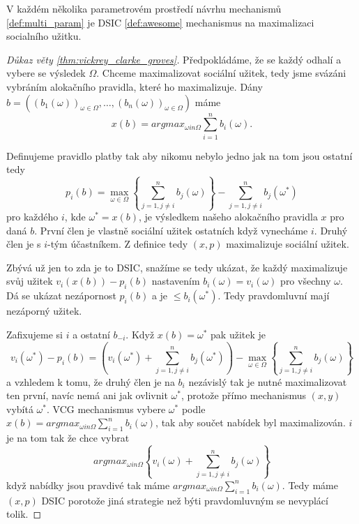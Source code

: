\begin{theorem}
    \label{thm:vickrey_clarke_groves}
    V každém několika parametrovém prostředí návrhu mechanismů \ref{def:multi_param} je DSIC \ref{def:awesome} mechanismus na maximalizaci socialního užitku. 
\end{theorem} 
\begin{proof}[Důkaz věty \ref{thm:vickrey_clarke_groves}]
   Předpokládáme, že se každý odhalí a vybere se výsledek $\Omega$. 
   Chceme maximalizovat sociální užitek, tedy jsme svázáni vybráním alokačního pravidla, které ho maximalizuje. 
   Dány $b = ((b_1(\omega))_{\omega \in \Omega},\dots,(b_n(\omega))_{\omega \in \Omega})$ máme 
   \[
       x(b) = argmax_{\omega in \Omega}\sum^n_{i=1} b_i(\omega). 
   \]

   Definujeme pravidlo platby tak aby nikomu nebylo jedno jak na tom jsou ostatní tedy 
   \[
   p_i(b) = \max_{\omega \in \Omega} \left\{ \sum^n_{j=1, j\neq i} b_j(\omega) \right\} - \sum^n_{j=1, j\neq i} b_j(\omega^*)
   \]
   pro každého $i$, kde $\omega^* = x(b)$, je výsledkem našeho alokačního pravidla $x$ pro daná $b$. 
   První člen je vlastně sociální užitek ostatních když vynecháme $i$. 
   Druhý člen je s $i$-tým účastníkem. 
   Z definice tedy $(x,p)$ maximalizuje sociální užitek. 
    
   Zbývá už jen to zda je to DSIC, snažíme se tedy ukázat, že každý maximalizuje svůj užitek $v_i(x(b)) - p_i(b)$ nastavením $b_i(\omega) = v_i(\omega)$ pro všechny $\omega$. 
   Dá se ukázat nezápornost $p_i(b)$ a je $\leq b_i(\omega^*)$. 
   Tedy pravdomluvní mají nezáporný užitek. 

   Zafixujeme si $i$ a ostatní $b_{-i}$. 
   Když $x(b)= \omega^*$ pak užitek je 
   \[
    v_i(\omega^*) - p_i(b) = \left( v_i(\omega^*) + \sum^n_{j=1, j\neq i} b_j(\omega^*) \right) - \max_{\omega \in \Omega} \left\{ \sum^n_{j=1, j\neq i} b_j(\omega) \right\} 
   \]
   a vzhledem k tomu, že druhý člen je na $b_i$ nezávislý tak je nutné maximalizovat ten první, navíc nemá ani jak ovlivnit $\omega^*$, protože přímo mechanismus $(x,y)$ vybítá $\omega^*$. 
   VCG mechanismus vybere $\omega^*$ podle  $x(b) = argmax_{\omega in \Omega}\sum^n_{i=1} b_i(\omega)$, tak aby součet nabídek byl maximalizován. 
   $i$ je na tom tak že chce vybrat 
   \[
   argmax_{\omega in \Omega} \left\{ v_i(\omega) + \sum^n_{j=1, j\neq i} b_j(\omega) \right\}
   \]
   když nabídky jsou pravdivé tak máme $argmax_{\omega in \Omega}\sum^n_{i=1} b_i(\omega)$. 
   Tedy máme $(x,p)$ DSIC porotože jiná strategie než býti pravdomluvným se nevyplácí tolik. 
\end{proof}
